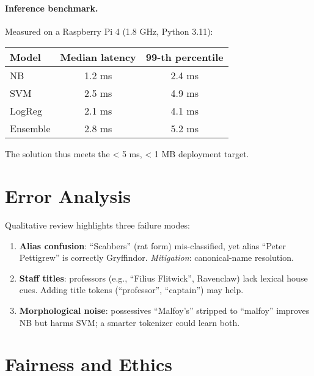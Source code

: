 \documentclass[12pt,a4paper]{article}
\begin{document}
\paragraph{Inference benchmark.}
Measured on a Raspberry Pi 4 (1.8 GHz, Python 3.11):

\begin{center}
\begin{tabular}{@{}lcc@{}}
\toprule
Model & Median latency & 99-th percentile \\
\midrule
NB         & 1.2 ms & 2.4 ms \\
SVM        & 2.5 ms & 4.9 ms \\
LogReg     & 2.1 ms & 4.1 ms \\
Ensemble   & 2.8 ms & 5.2 ms \\
\bottomrule
\end{tabular}
\end{center}

The solution thus meets the < 5 ms, < 1 MB deployment target.

\section{Error Analysis}\label{sec:error}

Qualitative review highlights three failure modes:

\begin{enumerate}[label=\alph*),leftmargin=2em]
  \item \textbf{Alias confusion}: “Scabbers” (rat form) mis-classified,
        yet alias “Peter Pettigrew” is correctly Gryffindor.  
        \emph{Mitigation}: canonical-name resolution.
  \item \textbf{Staff titles}: professors (e.g., “Filius Flitwick”,
        Ravenclaw) lack lexical house cues.  Adding title tokens
        (“professor”, “captain”) may help.
  \item \textbf{Morphological noise}: possessives “Malfoy’s” stripped to
        “malfoy” improves NB but harms SVM; a smarter tokenizer could
        learn both.
\end{enumerate}

\section{Fairness and Ethics}\label{sec:ethics}
\end{document}
